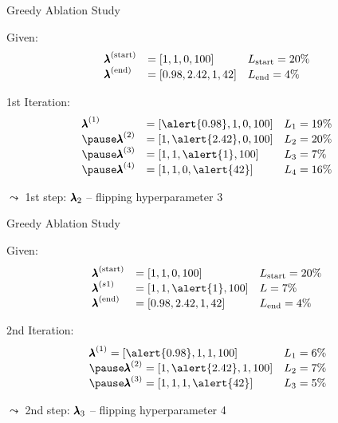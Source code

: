 \begin{frame}[c]{Greedy Ablation Study}

Given:
\begin{eqnarray}
\begin{array}{lll}
{\pmb{\lambda}}^{(\text{start})} &= [1, 1, 0, 100] & L_{\text{start}} = 20\% \nonumber\\
{\pmb{\lambda}}^{(\text{end})} &= [0.98, 2.42, 1, 42]  & L_{\text{end}} = 4\% \nonumber
\end{array}
\end{eqnarray}

\pause
1st Iteration:
\begin{eqnarray}
\begin{array}{lll}
\confI1& = [\alert{0.98}, 1, 0, 100] & \loss_1 = 19\% \nonumber\\
\pause
\confI2 &= [1, \alert{2.42}, 0, 100] & \loss_2 = 20\% \nonumber\\
\pause
\confI3 &= [1, 1, \alert{1}, 100] & \loss_3 = 7\% \nonumber\\
\pause
\confI4 &= [1, 1, 0, \alert{42}] & \loss_4 = 16\% \nonumber\\
\end{array}
\end{eqnarray}

\pause
$\leadsto$ 1st step: $\pmb{\lambda}_2$ -- flipping hyperparameter 3


\end{frame}
\begin{frame}[c]{Greedy Ablation Study}

Given:
\begin{eqnarray}
\begin{array}{lll}
\confI{\text{start}} &= [1, 1, 0, 100] & \loss_{\text{start}} = 20\% \nonumber\\
\confI{s1} &= [1, 1, \alert{1}, 100]  & \loss = 7\% \nonumber\\
\confI{\text{end}} &= [0.98, 2.42, 1, 42]  & \loss_{\text{end}} = 4\% \nonumber
\end{array}
\end{eqnarray}

2nd Iteration:
\begin{eqnarray}
\begin{array}{ll}
\confI1 = [\alert{0.98}, 1, 1, 100] & \loss_1 = 6\% \nonumber\\
\pause
\confI2 = [1, \alert{2.42}, 1, 100] & \loss_2 = 7\% \nonumber\\
\pause
\confI3 = [1, 1, 1, \alert{42}] & \loss_3 = 5\% \nonumber\\
\end{array}
\end{eqnarray}

$\leadsto$ 2nd step: $\pmb{\lambda}_3$ -- flipping hyperparameter 4

\end{frame}
